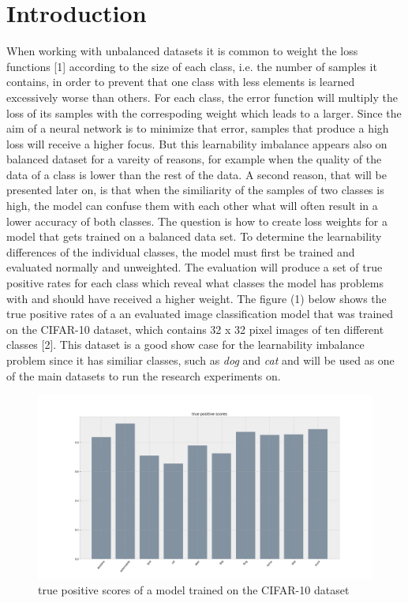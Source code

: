\documentclass[journal]{IEEEtran}
\begin{document}
\section{Introduction}
When working with unbalanced datasets it is common to weight the loss functions [1] according to the size of each class, i.e. the number of samples it contains, in order to prevent that one class with less elements is learned 
excessively worse than others.
For each class, the error function will multiply the loss of its samples with the correspoding weight which leads to a larger.
Since the aim of a neural network is to minimize that error, samples that produce a high loss will receive a higher focus.
But this learnability imbalance appears also on balanced dataset for a vareity of reasons, for example when the quality of the data of a class is lower than the rest of the data.
A second reason, that will be presented later on, is that when the similiarity of the samples of two classes is high, 
the model can confuse them with each other what will often result in a lower accuracy of both classes.
The question is how to create loss weights for a model that gets trained on a balanced data set. To determine the learnability differences of the individual classes, the model must first be trained and evaluated normally and unweighted.
The evaluation will produce a set of true positive rates for each class which reveal what classes the model has problems with and should have received a higher weight. 
The figure (1) below shows the true positive rates of a an evaluated image classification model that was trained on the CIFAR-10 dataset, which contains 32 x 32 pixel images of ten different classes [2].
This dataset is a good show case for the learnability imbalance problem since it has similiar classes, such as \emph{dog} and \emph{cat} and will be used as one of the main datasets to run the research experiments on.

\begin{figure}[h!]
        \includegraphics[width=\linewidth]{images/cifar10_tp_scores.png}
        \caption{true positive scores of a model trained on the CIFAR-10 dataset}
        \label{fig:tp_scores}
\end{figure}
\end{document}
